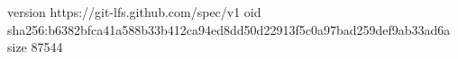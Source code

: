 version https://git-lfs.github.com/spec/v1
oid sha256:b6382bfca41a588b33b412ca94ed8dd50d22913f5c0a97bad259def9ab33ad6a
size 87544
